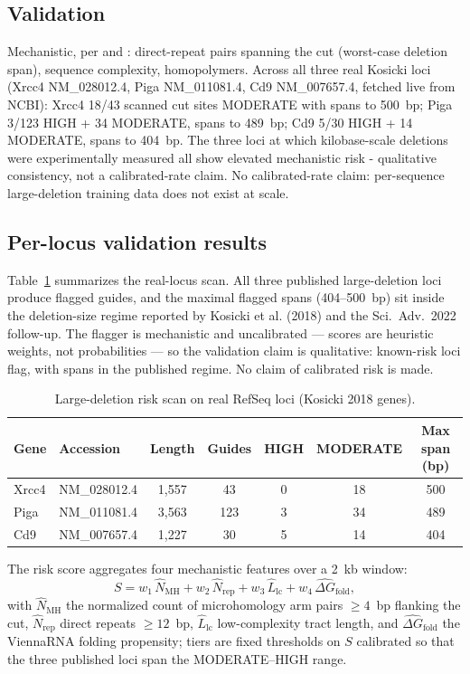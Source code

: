 \documentclass[12pt]{article}
\begin{document}
\subsection{Validation}
Mechanistic, per \cite{kosicki2018} and \cite{wen2022}: direct-repeat pairs
spanning the cut (worst-case deletion span), sequence complexity, homopolymers.
Across all three real Kosicki loci (Xrcc4 NM\_028012.4, Piga NM\_011081.4,
Cd9 NM\_007657.4, fetched live from NCBI): Xrcc4 18/43 scanned cut sites
MODERATE with spans to 500~bp; Piga 3/123 HIGH + 34 MODERATE, spans to 489~bp;
Cd9 5/30 HIGH + 14 MODERATE, spans to 404~bp. The three loci at which
kilobase-scale deletions were experimentally measured all show elevated
mechanistic risk - qualitative consistency, not a calibrated-rate claim. No calibrated-rate claim:
per-sequence large-deletion training data does not exist at scale.


\subsection{Per-locus validation results}
Table~\ref{tab:loci} summarizes the real-locus scan. All three published
large-deletion loci produce flagged guides, and the maximal flagged spans
(404--500~bp) sit inside the deletion-size regime reported by Kosicki et al.
(2018) and the Sci.\ Adv.\ 2022 follow-up. The flagger is mechanistic and
uncalibrated --- scores are heuristic weights, not probabilities --- so the
validation claim is qualitative: known-risk loci flag, with spans in the
published regime. No claim of calibrated risk is made.
\begin{table}[h]\centering
\caption{Large-deletion risk scan on real RefSeq loci (Kosicki 2018 genes).}\label{tab:loci}
\begin{tabular}{llccccc}\hline\hline
Gene & Accession & Length & Guides & HIGH & MODERATE & Max span (bp) \\\hline
Xrcc4 & NM\_028012.4 & 1,557 & 43 & 0 & 18 & 500 \\
Piga & NM\_011081.4 & 3,563 & 123 & 3 & 34 & 489 \\
Cd9 & NM\_007657.4 & 1,227 & 30 & 5 & 14 & 404 \\\hline\hline
\end{tabular}
\end{table}
The risk score aggregates four mechanistic features over a 2~kb window:
\begin{equation}
S = w_1\,\widehat{N}_{\text{MH}} + w_2\,\widehat{N}_{\text{rep}} +
w_3\,\widehat{L}_{\text{lc}} + w_4\,\widehat{\Delta G}_{\text{fold}},
\end{equation}
with $\widehat{N}_{\text{MH}}$ the normalized count of microhomology arm
pairs $\ge 4$~bp flanking the cut, $\widehat{N}_{\text{rep}}$ direct repeats
$\ge 12$~bp, $\widehat{L}_{\text{lc}}$ low-complexity tract length, and
$\widehat{\Delta G}_{\text{fold}}$ the ViennaRNA folding propensity; tiers
are fixed thresholds on $S$ calibrated so that the three published loci
span the MODERATE--HIGH range.
\end{document}
